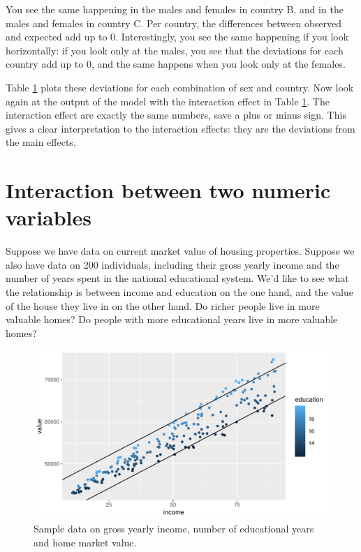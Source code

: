 \documentclass[]{book}\usepackage[]{graphicx}\usepackage[]{color}
\makeatletter
\def\maxwidth{ %
  \ifdim\Gin@nat@width>\linewidth
    \linewidth
  \else
    \Gin@nat@width
  \fi
}
\makeatother
\begin{document}
You see the same happening in the males and females in country B, and in the males and females in country C. Per country, the differences between observed and expected add up to 0. Interestingly, you see the same happening if you look horizontally: if you look only at the males, you see that the deviations for each country add up to 0, and the same happens when you look only at the females. 

Table \ref{} plots these deviations for each combination of sex and country. Now look again at the output of the model with the interaction effect in Table \ref{}. The interaction effect are exactly the same numbers, save a plus or minus sign. This gives a clear interpretation to the interaction effects: they are the deviations from the main effects. 










\section{Interaction between two numeric variables}

Suppose we have data on current market value of housing properties. Suppose we also have data on 200 individuals, including their gross yearly income and the number of years spent in the national educational system. We'd like to see what the relationship is between income and education on the one hand, and the value of the house they live in on the other hand. Do richer people live in more valuable homes? Do people with more educational years live in more valuable homes? 

\begin{figure}

{\centering \includegraphics[width=\maxwidth]{figure/linearbylinear_1-1} 

}

\caption[Sample data on gross yearly income, number of educational years and home market value]{Sample data on gross yearly income, number of educational years and home market value.}\label{fig:linearbylinear_1}
\end{figure}
\end{document}

